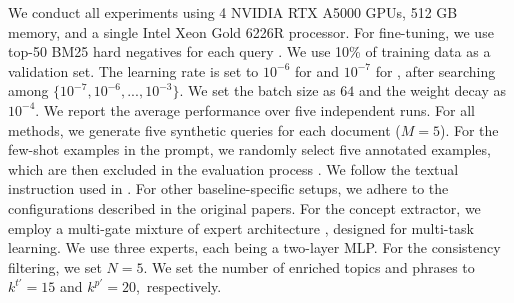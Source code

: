 We conduct all experiments using 4 NVIDIA RTX A5000 GPUs, 512 GB memory, and a single Intel Xeon Gold 6226R processor. 
For fine-tuning, we use top-50 BM25 hard negatives for each query \cite{formal2022distillation}.
We use 10\% of training data as a validation set. 
The learning rate is set to $10^{-6}$ for \ctr and $10^{-7}$ for \specter, after searching among $\{10^{-7}, 10^{-6}, ..., 10^{-3}\}$.
We set the batch size as $64$ and the weight decay as $10^{-4}$.
We report the average performance over five independent runs.
For all methods, we generate five synthetic queries for each document ($M=5$).
For the few-shot examples in the prompt, we randomly select five annotated examples, which are then excluded in the evaluation process \cite{dai2022promptagator}.
We follow the textual instruction used in \cite{pairwise_qgen}.
For other baseline-specific setups, we adhere to the configurations described in the original papers.
For the concept extractor, we employ a multi-gate mixture of expert architecture \cite{mmoe}, designed for multi-task learning.
We use three experts, each being a two-layer MLP.
For the consistency filtering, we set $N=5$.
We set the number of enriched topics and phrases to $k^{t'}=15$ and $k^{p'}=20$,~respectively.



